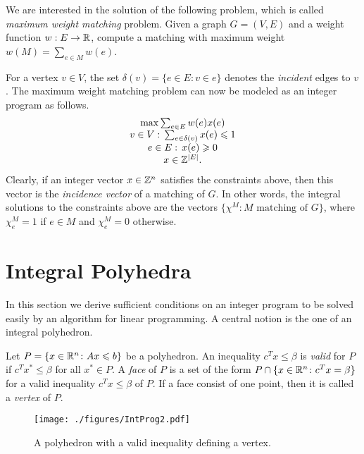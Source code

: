 We are interested in the solution of the following problem, which is
called \emph{maximum weight matching} problem. Given a graph $G =
(V,E)$ and a weight function $w:E\to\mathbb{R}$, compute a matching with
maximum weight $w(M) = \sum_{e \in M} w(e)$. 

For a vertex $v \in V$, the set $\delta(v) = \{e \in E \colon v \in e\}$ denotes
the \emph{incident} edges to $v$. 
The maximum weight matching problem  can now be modeled as an integer
program as follows. 
\begin{equation}
  \label{eq:45}
  \begin{array}{c}
    \max \sum_{e \in E} w(e) x(e) \\
    v \in V: \, \sum_{e \in \delta(v)} x(e)\leqslant1 \\
    e \in E:\,  x(e)  \geqslant0 \\
    x \in \mathbb{Z}^{|E|}.
  \end{array}
\end{equation}
% 
Clearly, if an integer vector $x \in \mathbb{Z}^n$ satisfies the constraints
above, then this vector is the \emph{incidence vector}  of a matching of
$G$. In other words, the integral solutions to the constraints above
are the vectors $\{\chi^M \colon M \text{ matching of }G\}$, where $\chi^M_e
= 1$ if $e \in M$ and $\chi^M_e=0$ otherwise. 

  
\section{Integral Polyhedra}


In this section we derive sufficient conditions on an integer program
to be solved easily by an algorithm for linear programming. A central
notion is the one of an integral polyhedron.  


\begin{definition} 
  \label{def:8}
  Let $P = \{ x \in \mathbb{R}^n \colon Ax\leqslant b\}$ be a polyhedron. An
  inequality $c^Tx\leq\beta$ is \emph{valid} for $P$ if $c^Tx^* \leq \beta$ for
  all $x^* \in P$.  A \emph{face} of $P$ is a set of the form $P \cap \{x
  \in \mathbb{R}^n \colon c^Tx = \beta\}$ for a valid inequality $c^Tx\leq\beta$ of $P$. If
  a face consist of one point, then it is called a \emph{vertex} of
  $P$. 
\end{definition}




\begin{figure}[htbp]
  \begin{center}{
   \texttt{[image: ./figures/IntProg2.pdf]}
    }    
  \end{center}
  \caption{A polyhedron with a valid inequality defining a vertex. }
  \label{fig:3}
\end{figure}




